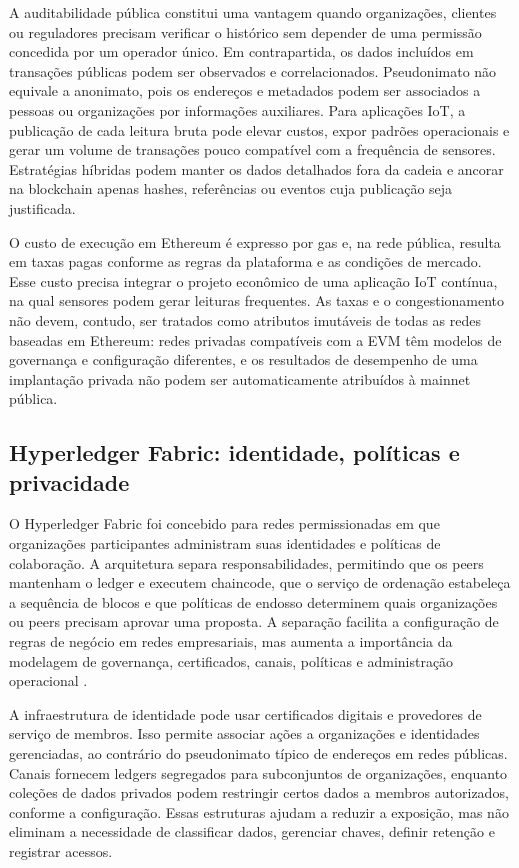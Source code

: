 \documentclass[10pt,a4paper,twocolumn]{article}
\begin{document}
A auditabilidade pública constitui uma vantagem quando organizações, clientes ou reguladores precisam verificar o histórico sem depender de uma permissão concedida por um operador único. Em contrapartida, os dados incluídos em transações públicas podem ser observados e correlacionados. Pseudonimato não equivale a anonimato, pois os endereços e metadados podem ser associados a pessoas ou organizações por informações auxiliares. Para aplicações IoT, a publicação de cada leitura bruta pode elevar custos, expor padrões operacionais e gerar um volume de transações pouco compatível com a frequência de sensores. Estratégias híbridas podem manter os dados detalhados fora da cadeia e ancorar na blockchain apenas hashes, referências ou eventos cuja publicação seja justificada.

O custo de execução em Ethereum é expresso por gas e, na rede pública, resulta em taxas pagas conforme as regras da plataforma e as condições de mercado. Esse custo precisa integrar o projeto econômico de uma aplicação IoT contínua, na qual sensores podem gerar leituras frequentes. As taxas e o congestionamento não devem, contudo, ser tratados como atributos imutáveis de todas as redes baseadas em Ethereum: redes privadas compatíveis com a EVM têm modelos de governança e configuração diferentes, e os resultados de desempenho de uma implantação privada não podem ser automaticamente atribuídos à mainnet pública.

\subsection{Hyperledger Fabric: identidade, políticas e privacidade}
O Hyperledger Fabric foi concebido para redes permissionadas em que organizações participantes administram suas identidades e políticas de colaboração. A arquitetura separa responsabilidades, permitindo que os peers mantenham o ledger e executem chaincode, que o serviço de ordenação estabeleça a sequência de blocos e que políticas de endosso determinem quais organizações ou peers precisam aprovar uma proposta. A separação facilita a configuração de regras de negócio em redes empresariais, mas aumenta a importância da modelagem de governança, certificados, canais, políticas e administração operacional \cite{Androulaki2018,FabricDocs}.

A infraestrutura de identidade pode usar certificados digitais e provedores de serviço de membros. Isso permite associar ações a organizações e identidades gerenciadas, ao contrário do pseudonimato típico de endereços em redes públicas. Canais fornecem ledgers segregados para subconjuntos de organizações, enquanto coleções de dados privados podem restringir certos dados a membros autorizados, conforme a configuração. Essas estruturas ajudam a reduzir a exposição, mas não eliminam a necessidade de classificar dados, gerenciar chaves, definir retenção e registrar acessos.
\end{document}
